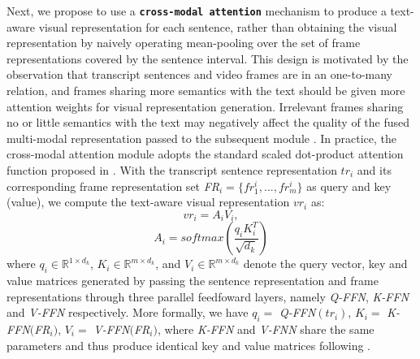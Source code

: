 \documentclass[runningheads]{llncs}
\begin{document}
Next, we propose to use a \textbf{\texttt{cross-modal attention}} mechanism to produce a text-aware visual representation for each sentence, rather than obtaining the visual representation by naively operating mean-pooling %
over the set of frame representations covered by the sentence interval.
This design is motivated by the observation that transcript sentences and video frames are in an one-to-many relation, and frames sharing more semantics with the text should be given more attention weights for visual representation generation. Irrelevant frames sharing no or little semantics with the text may negatively affect the quality of the fused multi-modal representation passed to the subsequent module \cite{wang-etal-2022-contrastive-video}.
In practice, the cross-modal attention module adopts the standard scaled dot-product attention function proposed in \cite{NIPS2017_3f5ee243}. With the transcript sentence representation $tr_i$ and its corresponding frame representation set \textit{FR}$_i = \{ fr^i_1, ... , fr^i_m \}$ as query and key (value), we compute the text-aware visual representation ${vr}_i$ as:
\vspace{-1ex}
\begin{equation}
    {vr}_i =  A_i V_i, \label{eq:1}
\end{equation}
\vspace{-2ex}
\begin{equation}
    A_i = softmax(\frac{q_{i}K_{i}^T}{\sqrt{d_k}}) \label{eq:2}
\end{equation}
where $q_i \in \mathbb{R}^{1 \times d_k}$, $K_i \in \mathbb{R}^{m \times d_k}$, and $V_i \in \mathbb{R}^{m \times d_k}$ denote the query vector, key and value matrices generated by passing the sentence representation and frame representations through three parallel feedfoward layers, namely \textit{Q-FFN}, \textit{K-FFN} and \textit{V-FFN} respectively. More formally, we have $q_i = $ \textit{Q-FFN}$(tr_i)$, $K_i = $ \textit{K-FFN}$($\textit{FR}$_i)$, $V_i = $ \textit{V-FFN}$($\textit{FR}$_i)$, where \textit{K-FFN} and \textit{V-FNN} share the same parameters and thus produce identical key and value matrices following \cite{10.5555/3157096.3157129,DBLP:journals/corr/abs-2004-12238}.
\end{document}
